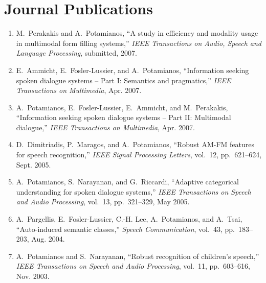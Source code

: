 

\setlength{\textwidth}{6.35 in}
\setlength{\evensidemargin}{0.000 in}
\setlength{\oddsidemargin}{0.000 in}
\setlength{\textheight}{8.80 in}
\setlength{\topmargin}{ -0.25 in}

\pagestyle{empty}




\section*{Journal Publications}

\begin{enumerate}

\item
M.~Perakakis and A.~Potamianos, ``A study in efficiency and modality usage in
  multimodal form filling systems,'' {\em IEEE Transactions on Audio, Speech
  and Language Processing},  submitted, 2007.

\item
E.~Ammicht, E.~Fosler-Lussier, and A.~Potamianos, ``Information seeking spoken
  dialogue systems -- {P}art {I}: Semantics and pragmatics,'' {\em IEEE
  Transactions on Multimedia}, Apr. 2007.

\item
A.~Potamianos, E.~Fosler-Lussier, E.~Ammicht, and M.~Perakakis, ``Information
  seeking spoken dialogue systems -- {P}art {II}: Multimodal dialogue,'' {\em
  IEEE Transactions on Multimedia}, Apr. 2007.

\item
D.~Dimitriadis, P.~Maragos, and A.~Potamianos, ``Robust AM-FM features for
  speech recognition,'' {\em IEEE Signal Processing Letters}, vol.~12,
  pp.~621--624, Sept. 2005.

\item
A.~Potamianos, S.~Narayanan, and G.~Riccardi, ``Adaptive categorical
  understanding for spoken dialogue systems,'' {\em IEEE Transactions on Speech
  and Audio Processing}, vol.~13, pp.~321--329, May 2005.

\item
A.~Pargellis, E.~Fosler-Lussier, C.-H. Lee, A.~Potamianos, and A.~Tsai,
  ``Auto-induced semantic classes,'' {\em Speech Communication}, vol.~43,
  pp.~183--203, Aug. 2004.

\item
A.~Potamianos and S.~Narayanan, ``Robust recognition of children's speech,''
  {\em IEEE Transactions on Speech and Audio Processing}, vol.~11,
  pp.~603--616, Nov. 2003.


\end{enumerate}
